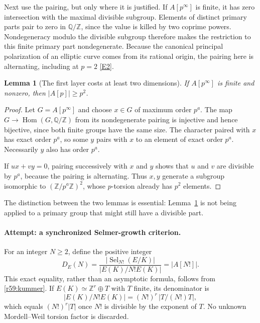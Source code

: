 \documentclass[11pt,a4paper]{article}
\newcommand{\Z}{\mathbb{Z}}
\newcommand{\Q}{\mathbb{Q}}
\newcommand{\eref}[2]{\hyperlink{extra:#1:#2}{[E#2]}}
\newtheorem{notebooklemma}{Lemma}[section]
\numberwithin{equation}{section}
\begin{document}
Next use the pairing, but only where it is justified. If $A[p^\infty]$ is finite, it has zero intersection with the maximal divisible subgroup. Elements of distinct primary parts pair to zero in $\Q/\Z$, since the value is killed by two coprime powers. Nondegeneracy modulo the divisible subgroup therefore makes the restriction to this finite primary part nondegenerate. Because the canonical principal polarization of an elliptic curve comes from its rational origin, the pairing here is alternating, including at $p=2$ \eref{statement}{2}.

\begin{notebooklemma}[The first layer costs at least two dimensions]\label{r59:two}
If $A[p^\infty]$ is finite and nonzero, then $|A[p]|\geq p^2$.
\end{notebooklemma}
\begin{proof}
Let $G=A[p^\infty]$ and choose $x\in G$ of maximum order $p^a$. The map $G\to\operatorname{Hom}(G,\Q/\Z)$ from its nondegenerate pairing is injective and hence bijective, since both finite groups have the same size. The character paired with $x$ has exact order $p^a$, so some $y$ pairs with $x$ to an element of exact order $p^a$. Necessarily $y$ also has order $p^a$.

If $ux+vy=0$, pairing successively with $x$ and $y$ shows that $u$ and $v$ are divisible by $p^a$, because the pairing is alternating. Thus $x,y$ generate a subgroup isomorphic to $(\Z/p^a\Z)^2$, whose $p$-torsion already has $p^2$ elements.
\end{proof}
The distinction between the two lemmas is essential: Lemma~\ref{r59:two} is not being applied to a primary group that might still have a divisible part.

\paragraph{Attempt: a synchronized Selmer-growth criterion.}
For an integer $N\geq2$, define the positive integer
\begin{equation}\label{r59:defect}
 D_E(N)=\frac{|\operatorname{Sel}_{N!}(E/K)|}
                   {|E(K)/N!E(K)|}=|A[N!]|.
\end{equation}
This exact equality, rather than an asymptotic formula, follows from \eqref{r59:kummer}. If $E(K)\simeq\Z^r\oplus T$ with $T$ finite, its denominator is
\[
 |E(K)/N!E(K)|=(N!)^r\,|T/(N!)T|,
\]
which equals $(N!)^r|T|$ once $N!$ is divisible by the exponent of $T$. No unknown Mordell--Weil torsion factor is discarded.
\end{document}
